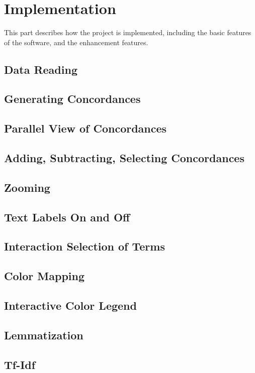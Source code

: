 \clearpage
\section{Implementation}
This part describes how the project is implemented, including the basic features of the software, and the enhancement features.

\subsection{Data Reading}

\subsection{Generating Concordances}

\subsection{Parallel View of Concordances}

\subsection{Adding, Subtracting, Selecting Concordances}

\subsection{Zooming}

\subsection{Text Labels On and Off}

\subsection{Interaction Selection of Terms}

\subsection{Color Mapping}

\subsection{Interactive Color Legend}

\subsection{Lemmatization}

\subsection{Tf-Idf}





